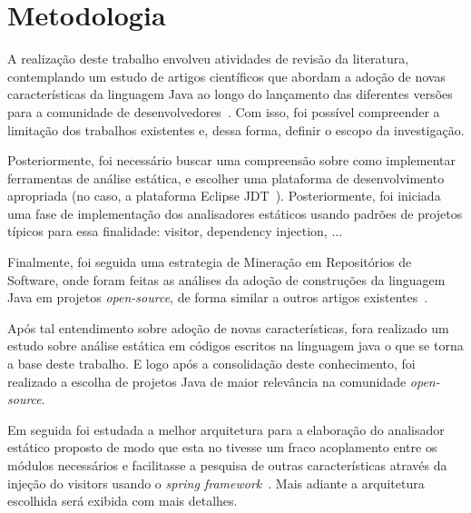 %


\section{Metodologia}
    
    A realização deste trabalho envolveu atividades de revisão da literatura, contemplando um estudo 
    de artigos científicos que abordam a adoção de novas características da linguagem Java ao longo do 
    lançamento das diferentes versões para a comunidade de desenvolvedores~\cite{Schaefer:ACM2009, Dyer:2013, Parnin:ACM2011, Overbey:2009, Dyer:ACM2014, Bracha:ACM1998, bonifacio:scam2015}. Com isso, foi 
    possível compreender a limitação dos trabalhos existentes e, dessa forma, definir o escopo da 
    investigação. 
    
    Posteriormente, foi necessário buscar uma compreensão sobre como implementar ferramentas de 
    análise estática, e escolher uma plataforma de desenvolvimento apropriada (no caso, a plataforma 
    Eclipse JDT~\cite{EclipseJDT}). Posteriormente, foi iniciada uma fase de implementação dos analisadores 
    estáticos usando padrões de projetos típicos para essa finalidade: visitor, dependency injection, ...
    
     Finalmente, foi seguida uma estrategia de Mineração em Repositórios de Software, onde foram 
     feitas as análises da adoção de construções da linguagem Java em projetos \textit{open-source}, de forma 
     similar a outros artigos existentes~\cite{Schaefer:ACM2010,pinto-jss:2015,donovan:2004,dinklage:2004, Schaefer:ACM2009, Schaefer:ACM2010, Overbey:2009, Wichmann95industrialperspective, Ayewah:2008:USA:1439186.1439221, bracha1998gj}. 
     
	
	Após tal entendimento sobre adoção de novas características, fora realizado um estudo sobre análise estática em códigos escritos na linguagem java o que se torna a base deste trabalho. E logo após a consolidação deste conhecimento, foi realizado a escolha de projetos Java de maior relevância na comunidade \textit{open-source}.
	
	Em seguida foi estudada a melhor arquitetura para a elaboração do analisador estático proposto de modo que esta no tivesse um fraco acoplamento entre os módulos necessários e facilitasse a pesquisa de outras características através da injeção do visitors \cite{Gamma:1995} usando o \textit{spring framework}~\cite{SPRING_REF}. Mais adiante a arquitetura escolhida será exibida com mais detalhes.
